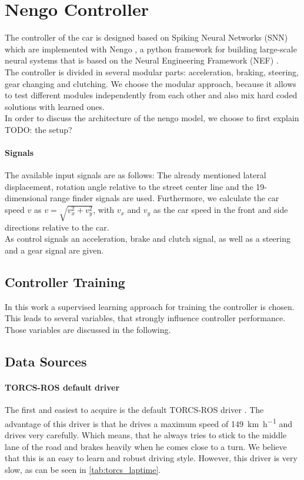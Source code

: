 \documentclass[10pt,a4paper,twoside,journal]{IEEEtran}
\begin{document}
\section{Nengo Controller}
\label{sc:controller}

The controller of the car is designed based on Spiking Neural Networks (SNN) which are implemented with Nengo \cite{nengo}, a python framework for building large-scale neural systems that is based on the Neural Engineering Framework (NEF) \cite{nef}. \\
The controller is divided in several modular parts: acceleration, braking, steering, gear changing and clutching. We choose the modular approach, because it allows to test different modules independently from each other and also mix hard coded solutions with learned ones. \\
In order to discuss the architecture of the nengo model, we choose to first explain TODO: the setup?

\paragraph{Signals}
The available input signals are as follows: The already mentioned lateral displacement, rotation angle relative to the street center line and the 19-dimensional range finder signals are used. Furthermore, we calculate the car speed $ v $ as $ v = \sqrt{v_x^2 + v_y^2} $, with $ v_x $ and $ v_y $ as the car speed in the front and side directions relative to the car. \\
As control signals an acceleration, brake and clutch signal, as well as a steering and a gear signal are given.

\subsection{Controller Training}
In this work a supervised learning approach for training the controller is chosen. This leads to several variables, that strongly influence controller performance. Those variables are discussed in the following.

\subsection{Data Sources}
\paragraph{TORCS-ROS default driver}
The first and easiest to acquire is the default TORCS-ROS driver \cite{mirus_torcs-ros_2017}. The advantage of this driver is that he drives a maximum speed of \SI{149}{\km\per\hour} and drives very carefully. Which means, that he always tries to stick to the middle lane of the road and brakes heavily when he comes close to a turn. We believe that this is an easy to learn and robust driving style. However, this driver is very slow, as can be seen in \autoref{tab:torcs_laptime}.
\end{document}
